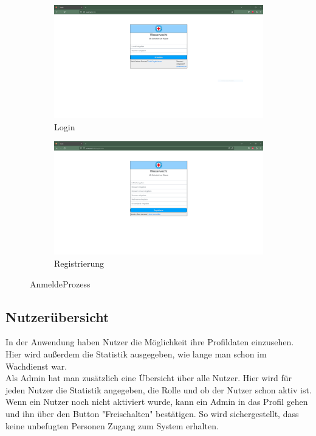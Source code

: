 \documentclass[fontsize=12pt,openright,oneside,paper=a4,BCOR=1cm]{scrbook}
\begin{document}
\begin{figure}[H]
  \centering
  \begin{subfigure}[b]{0.4\linewidth}
    \includegraphics[width=\linewidth]{Anlagen/Anwendung/1Login.png}
    \caption{Login}
  \end{subfigure}
  \begin{subfigure}[b]{0.4\linewidth}
    \includegraphics[width=\linewidth]{Anlagen/Anwendung/2Registrieren.png}
    \caption{Registrierung}
  \end{subfigure}
  \caption{AnmeldeProzess}
  \label{fig:anwendung-anmeldeprozess}
\end{figure}

\subsection{Nutzerübersicht}

In der Anwendung haben Nutzer die Möglichkeit ihre Profildaten einzusehen. Hier wird außerdem die Statistik ausgegeben, wie lange man schon im Wachdienst war. \\
Als Admin hat man zusätzlich eine Übersicht über alle Nutzer. Hier wird für jeden Nutzer die Statistik angegeben, die Rolle und ob der Nutzer schon aktiv ist. Wenn ein Nutzer noch nicht aktiviert wurde, kann ein Admin in das Profil gehen und ihn über den Button "Freischalten" bestätigen. So wird sichergestellt, dass keine unbefugten Personen Zugang zum System erhalten.
\end{document}
